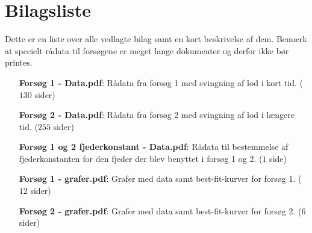\section*{Bilagsliste}
Dette er en liste over alle vedlagte bilag samt en kort beskrivelse af dem.
Bemærk at specielt rådata til forsøgene er meget lange dokumenter og derfor ikke bør printes. 

\begin{itemize}[leftmargin=0.5\textwidth]
	\item[\textbf{Forsøg 1 - Data.pdf}:] Rådata fra forsøg 1 med svingning af lod i kort tid. ($130$ sider)
	\item[\textbf{Forsøg 2 - Data.pdf}:] Rådata fra forsøg 2 med svingning af lod i længere tid. ($255$ sider) 
	\item[\textbf{Forsøg 1 og 2 fjederkonstant - Data.pdf}:] Rådata til bestemmelse af fjederkonstanten for den fjeder der blev benyttet i forsøg 1 og 2. ($1$ side)
	\item[\textbf{Forsøg 1 - grafer.pdf}:] Grafer med data samt best-fit-kurver for forsøg 1. ($12$ sider)
	\item[\textbf{Forsøg 2 - grafer.pdf}:] Grafer med data samt best-fit-kurver for forsøg 2. ($6$ sider)
\end{itemize}